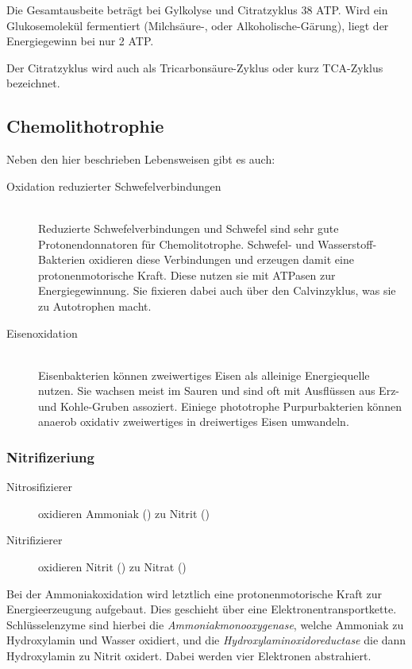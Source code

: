 Die Gesamtausbeite beträgt bei Gylkolyse und Citratzyklus 38 ATP.
Wird ein Glukosemolekül fermentiert (Milchsäure-, oder Alkoholische-Gärung),
liegt der Energiegewinn bei nur 2 ATP.

Der Citratzyklus wird auch als Tricarbonsäure-Zyklus oder kurz TCA-Zyklus bezeichnet.

\subsection{Chemolithotrophie}
Neben den hier beschrieben Lebensweisen gibt es auch:

\begin{description}
	\item[Oxidation reduzierter Schwefelverbindungen] \hfill \\
		Reduzierte Schwefelverbindungen 
		und Schwefel sind sehr gute Protonendonnatoren für Chemolitotrophe.
		Schwefel- und Wasserstoff-Bakterien oxidieren diese Verbindungen
		und erzeugen damit eine protonenmotorische Kraft.
		Diese nutzen sie mit ATPasen zur Energiegewinnung.
		Sie fixieren dabei auch  über den Calvinzyklus,
		was sie zu Autotrophen macht.

	\item[Eisenoxidation]	\hfill	\\
		Eisenbakterien können zweiwertiges Eisen als alleinige Energiequelle nutzen.
		Sie wachsen meist im Sauren 
		und sind oft mit Ausflüssen aus Erz- und Kohle-Gruben assoziert.
		Einiege phototrophe Purpurbakterien können
		anaerob oxidativ zweiwertiges in dreiwertiges Eisen umwandeln.

\end{description}

\subsubsection{Nitrifizeriung}
\begin{description}
	\item[Nitrosifizierer] oxidieren Ammoniak () zu Nitrit ()
	\item[Nitrifizierer] oxidieren Nitrit () zu Nitrat ()
\end{description}

Bei der Ammoniakoxidation wird letztlich eine protonenmotorische Kraft
zur Energieerzeugung aufgebaut.
Dies geschieht über eine Elektronentransportkette.
Schlüsselenzyme sind hierbei die \emph{Ammoniakmonooxygenase},
welche Ammoniak zu Hydroxylamin und Wasser oxidiert,
und die \emph{Hydroxylaminoxidoreductase} die dann Hydroxylamin
zu Nitrit oxidert.
Dabei werden vier Elektronen abstrahiert.

